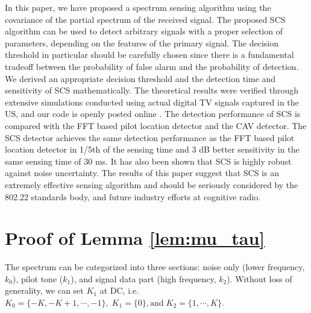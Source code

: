 \documentclass[draftclsnofoot,onecolumn,12pt]{IEEEtran}
\begin{document}
In this paper, we have proposed a spectrum sensing algorithm using the covariance of the partial spectrum of the received signal.
The proposed SCS algorithm can be used to
detect arbitrary signals with a proper selection of parameters, depending on the features of the primary signal.
The decision threshold in particular should be carefully chosen since there is a fundamental tradeoff between the probability of false alarm and the probability of detection.
We derived an appropriate decision threshold and the detection time and sensitivity of SCS mathematically.
The theoretical results were verified through extensive simulations
conducted using actual digital TV signals captured in the US, and our code is openly posted online \cite{SCS-CODE-URL}.
The detection performance of SCS is compared with the FFT based pilot location detector and
the CAV detector. The SCS detector achieves the same detection performance as the FFT based pilot location detector in 1/5th of the sensing time
and 3 dB better sensitivity in the same sensing time of 30 ms. It has also been shown that SCS is highly robust
against noise uncertainty. 
The results of this paper suggest that SCS is an extremely effective sensing algorithm
and should be seriously considered by the 802.22 standards body, and future industry efforts at cognitive radio. 


\appendices
\section{Proof of Lemma \ref{lem:mu_tau}}
\label{apdx:proof_mu_tau}

The spectrum can be categorized into three sections: noise only (lower frequency, $k_0$), pilot tone ($k_1$), and signal data part (high frequency, $k_2$).
Without loss of generality, we can set
$K_1$ at DC, i.e. $K_0 = \{-K, -K+1, \cdots, -1\}, \; K_1 = \{0\}, \mathrm{and } \; K_2 = \{1, \cdots, K\}$.
\end{document}
